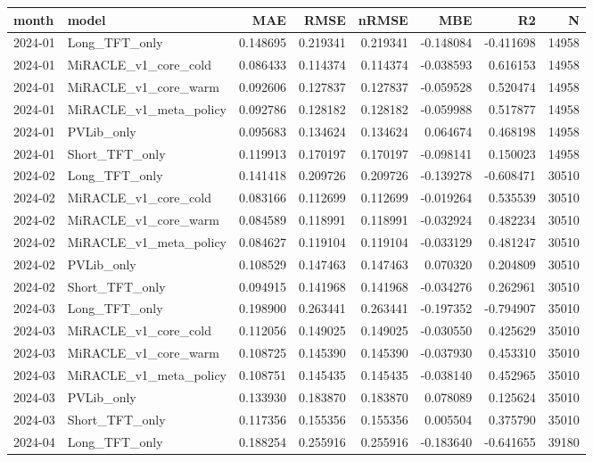 \begin{tabular}{llrrrrrr}
\toprule
month & model & MAE & RMSE & nRMSE & MBE & R2 & N \\
\midrule
2024-01 & Long_TFT_only & 0.148695 & 0.219341 & 0.219341 & -0.148084 & -0.411698 & 14958 \\
2024-01 & MiRACLE_v1_core_cold & 0.086433 & 0.114374 & 0.114374 & -0.038593 & 0.616153 & 14958 \\
2024-01 & MiRACLE_v1_core_warm & 0.092606 & 0.127837 & 0.127837 & -0.059528 & 0.520474 & 14958 \\
2024-01 & MiRACLE_v1_meta_policy & 0.092786 & 0.128182 & 0.128182 & -0.059988 & 0.517877 & 14958 \\
2024-01 & PVLib_only & 0.095683 & 0.134624 & 0.134624 & 0.064674 & 0.468198 & 14958 \\
2024-01 & Short_TFT_only & 0.119913 & 0.170197 & 0.170197 & -0.098141 & 0.150023 & 14958 \\
2024-02 & Long_TFT_only & 0.141418 & 0.209726 & 0.209726 & -0.139278 & -0.608471 & 30510 \\
2024-02 & MiRACLE_v1_core_cold & 0.083166 & 0.112699 & 0.112699 & -0.019264 & 0.535539 & 30510 \\
2024-02 & MiRACLE_v1_core_warm & 0.084589 & 0.118991 & 0.118991 & -0.032924 & 0.482234 & 30510 \\
2024-02 & MiRACLE_v1_meta_policy & 0.084627 & 0.119104 & 0.119104 & -0.033129 & 0.481247 & 30510 \\
2024-02 & PVLib_only & 0.108529 & 0.147463 & 0.147463 & 0.070320 & 0.204809 & 30510 \\
2024-02 & Short_TFT_only & 0.094915 & 0.141968 & 0.141968 & -0.034276 & 0.262961 & 30510 \\
2024-03 & Long_TFT_only & 0.198900 & 0.263441 & 0.263441 & -0.197352 & -0.794907 & 35010 \\
2024-03 & MiRACLE_v1_core_cold & 0.112056 & 0.149025 & 0.149025 & -0.030550 & 0.425629 & 35010 \\
2024-03 & MiRACLE_v1_core_warm & 0.108725 & 0.145390 & 0.145390 & -0.037930 & 0.453310 & 35010 \\
2024-03 & MiRACLE_v1_meta_policy & 0.108751 & 0.145435 & 0.145435 & -0.038140 & 0.452965 & 35010 \\
2024-03 & PVLib_only & 0.133930 & 0.183870 & 0.183870 & 0.078089 & 0.125624 & 35010 \\
2024-03 & Short_TFT_only & 0.117356 & 0.155356 & 0.155356 & 0.005504 & 0.375790 & 35010 \\
2024-04 & Long_TFT_only & 0.188254 & 0.255916 & 0.255916 & -0.183640 & -0.641655 & 39180 \\

\end{tabular}
